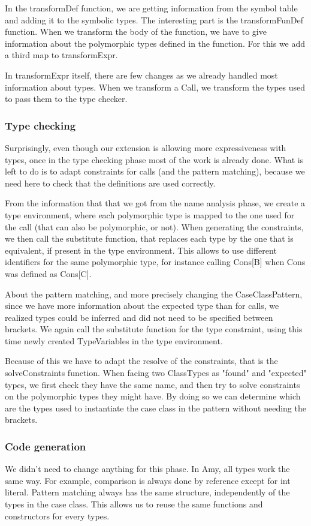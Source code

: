 In the transformDef function, we are getting information from the symbol table and adding it to the symbolic types. The interesting part is the transformFunDef function. When we transform the body of the function, we have to give information about the polymorphic types defined in the function. For this we add a third map to transformExpr.

In transformExpr itself, there are few changes as we already handled most information about types. When we transform a Call, we transform the types used to pass them to the type checker.
\subsubsection{Type checking}
Surprisingly, even though our extension is allowing more expressiveness with types, once in the type checking phase most of the work is already done. What is left to do is to adapt constraints for calls (and the pattern matching), because we need here to check that the definitions are used correctly. 

From the information that that we got from the name analysis phase, we create a type environment, where each polymorphic type is mapped to the one used for the call (that can also be polymorphic, or not). When generating the constraints, we then call the substitute function, that replaces each type by the one that is equivalent, if present in the type environment. This allows to use different identifiers for the same polymorphic type, for instance calling Cons[B] when Cons was defined as Cons[C].

About the pattern matching, and more precisely changing the CaseClassPattern, since we have more information about the expected type than for calls, we realized types could be inferred and did not need to be specified between brackets. We again call the substitute function for the type constraint, using this time newly created TypeVariables in the type environment. 

Because of this we have to adapt the resolve of the constraints, that is the solveConstraints function. When facing two ClassTypes as "found" and "expected" types, we first check they have the same name, and then try to solve constraints on the polymorphic types they might have. By doing so we can determine which are the types used to instantiate the case class in the pattern without needing the brackets.
\subsubsection{Code generation}
We didn't need to change anything for this phase. In Amy, all types work the same way. For example, comparison is always done by reference except for int literal. Pattern matching always has the same structure, independently of the types in the case class. This allows us to reuse the same functions and constructors for every types.
